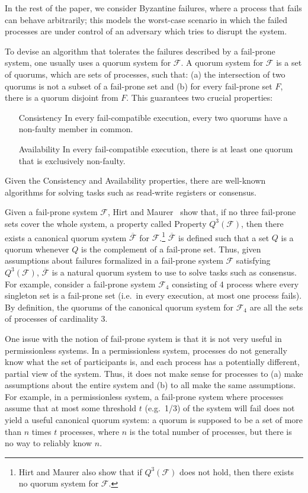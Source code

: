 \documentclass[11pt,letterpaper]{article}
\begin{document}
In the rest of the paper, we consider Byzantine failures, where a process that fails can behave arbitrarily; this models the worst-case scenario in which the failed processes are under control of an adversary which tries to disrupt the system.

To devise an algorithm that tolerates the failures described by a fail-prone system, one usually uses a quorum system for $\mathcal{F}$.
A quorum system for $\mathcal{F}$ is a set of quorums, which are sets of processes, such that: (a) the intersection of two quorums is not a subset of a fail-prone set and (b) for every fail-prone set $F$, there is a quorum disjoint from $F$.
This guarantees two crucial properties:
\begin{itemize}
  \item[Consistency] In every fail-compatible execution, every two quorums have a non-faulty member in common.
  \item[Availability] In every fail-compatible execution, there is at least one quorum that is exclusively non-faulty.
\end{itemize}
Given the Consistency and Availability properties, there are well-known algorithms for solving tasks such as read-write registers or consensus.

Given a fail-prone system $\mathcal{F}$, Hirt and Maurer~\cite{hirtPlayerSimulationGeneral2000} show that, if no three fail-prone sets cover the whole system, a property called Property $Q^3(\mathcal{F})$, then there exists a canonical quorum system $\overline{\mathcal{F}}$ for $\mathcal{F}$.\footnote{Hirt and Maurer also show that if $Q^3(\mathcal{F})$ does not hold, then there exists no quorum system for $\mathcal{F}$.}
$\overline{\mathcal{F}}$ is defined such that a set $Q$ is a quorum whenever $Q$ is the complement of a fail-prone set.
Thus, given assumptions about failures formalized in a fail-prone system $\mathcal{F}$ satisfying $Q^3\left(\mathcal{F}\right)$, $\overline{\mathcal{F}}$ is a natural quorum system to use to solve tasks such as consensus.
For example, consider a fail-prone system $\mathcal{F}_4$ consisting of 4 process where every singleton set is a fail-prone set (i.e.\ in every execution, at most one process fails).
By definition, the quorums of the canonical quorum system for $\mathcal{F}_4$ are all the sets of processes of cardinality 3.

One issue with the notion of fail-prone system is that it is not very useful in permissionless systems.
In a permissionless system, processes do not generally know what the set of participants is, and each process has a potentially different, partial view of the system.
Thus, it does not make sense for processes to (a) make assumptions about the entire system and (b) to all make the same assumptions.
For example, in a permissionless system, a fail-prone system where processes assume that at most some threshold $t$ (e.g.\ 1/3) of the system will fail does not yield a useful canonical quorum system: a quorum is supposed to be a set of more than $n$ times $t$ processes, where $n$ is the total number of processes, but there is no way to reliably know $n$.
\end{document}
